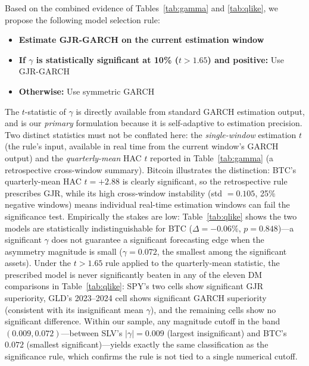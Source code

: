 Based on the combined evidence of Tables~\ref{tab:gamma} and \ref{tab:qlike}, we propose the following model selection rule:
\begin{itemize}
\item \textbf{Estimate GJR-GARCH on the current estimation window}
\item \textbf{If $\gamma$ is statistically significant at 10\% ($t > 1.65$) and positive:} Use GJR-GARCH
\item \textbf{Otherwise:} Use symmetric GARCH
\end{itemize}
The $t$-statistic of $\gamma$ is directly available from standard GARCH estimation output, and is our \emph{primary} formulation because it is self-adaptive to estimation precision. Two distinct statistics must not be conflated here: the \emph{single-window} estimation $t$ (the rule's input, available in real time from the current window's GARCH output) and the \emph{quarterly-mean} HAC $t$ reported in Table~\ref{tab:gamma} (a retrospective cross-window summary). Bitcoin illustrates the distinction: BTC's quarterly-mean HAC $t = +2.88$ is clearly significant, so the retrospective rule prescribes GJR, while its high cross-window instability (std $= 0.105$, 25\% negative windows) means individual real-time estimation windows can fail the significance test. Empirically the stakes are low: Table~\ref{tab:qlike} shows the two models are statistically indistinguishable for BTC ($\Delta = -0.06\%$, $p = 0.848$)---a significant $\gamma$ does not guarantee a significant forecasting edge when the asymmetry magnitude is small ($\gamma = 0.072$, the smallest among the significant assets). Under the $t > 1.65$ rule applied to the quarterly-mean statistic, the prescribed model is never significantly beaten in any of the eleven DM comparisons in Table~\ref{tab:qlike}: SPY's two cells show significant GJR superiority, GLD's 2023--2024 cell shows significant GARCH superiority (consistent with its insignificant mean $\gamma$), and the remaining cells show no significant difference. Within our sample, any magnitude cutoff in the band $(0.009, 0.072)$---between SLV's $|\gamma| = 0.009$ (largest insignificant) and BTC's $0.072$ (smallest significant)---yields exactly the same classification as the significance rule, which confirms the rule is not tied to a single numerical cutoff.

